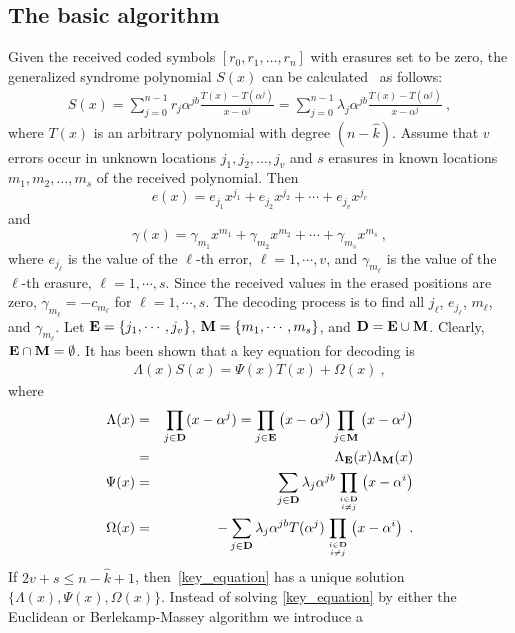 \documentclass[10pt,journal,letterpaper,compsoc]{IEEEtran}
\newcommand{\nn}{\nonumber}
\newcommand{\0}{{\bf 0}}
\begin{document}
\subsection{The basic algorithm}
Given the received coded symbols $[r_0, r_1, \ldots, r_n]$ with erasures
set to be zero, the generalized syndrome polynomial $S(x)$ can be
calculated~\cite{ARA92} as follows:
\begin{align}
S(x)=\displaystyle\sum_{j=0}^{n-1}r_j\alpha^{jb}\frac{T(x)-T(\alpha^j)}{x-\alpha^j}
=\displaystyle\sum_{j=0}^{n-1}\lambda_j\alpha^{jb}\frac{T(x)-T(\alpha^j)}{x-\alpha^j}~,
\label{syndrome}
\end{align}
where $T(x)$ is an arbitrary polynomial with degree $(n-\hat{k})$. Assume that $v$ errors occur in unknown locations
$j_1,j_2,\ldots,j_v$ and $s$ erasures in known locations $m_1,m_2,\ldots, m_s$ of the received polynomial. Then
$$e(x)=e_{j_1}x^{j_1}+e_{j_2}x^{j_2}+\cdots+e_{j_v}x^{j_v}$$
and
$$\gamma(x)=\gamma_{m_1}x^{m_1}+\gamma_{m_2}x^{m_2}+\cdots+\gamma_{m_s}x^{m_s}~,$$
where $e_{j_\ell}$ is the value of the $\ell$-th error, $\ell=1, \cdots, v$, and $\gamma_{m_\ell}$ is the value of the $\ell$-th erasure, $\ell=1, \cdots, s$. Since the received values in the erased positions are zero, $\gamma_{m_\ell}=-c_{m_\ell}$ for $\ell= 1, \cdots, s$. The decoding
process is to find all $j_\ell$, $e_{j_\ell}$, $m_\ell$, and $\gamma_{m_\ell}$. Let ${\bf E}=\{j_1,\cdots,j_v\}$, ${\bf M}=\{m_1,\cdots,m_s\}$, and ${\bf D}={\bf E}\cup {\bf M}$. Clearly, ${\bf E}\cap {\bf M}=\emptyset$.
It has been shown that a key equation for decoding is
\begin{eqnarray}
\Lambda(x)S(x)=\Psi(x)T(x)+\Omega(x)~,\label{key_equation}
\end{eqnarray}
where
\begin{eqnarray}
\Lambda(x)&=&\prod_{j\in {\bf D}}(x-\alpha^j)=\prod_{j\in {\bf E}}\left(x-\alpha^j\right)\prod_{j\in {\bf M}}\left(x-\alpha^j\right)\nn\\
&=&\Lambda_{\bf E}(x)\Lambda_{\bf M}(x)\label{sigma}\\
\Psi(x)&=&\sum_{j\in {\bf D}}\lambda_j\alpha^{jb}\prod_{{i\in {\bf D}}\atop{i\neq j}}\left(x-\alpha^i\right)\label{psi}\\
\Omega(x)&=&-\sum_{j\in {\bf D}}\lambda_j\alpha^{jb}T(\alpha^j)\prod_{{i\in {\bf D}}\atop{i\neq j}}\left(x-\alpha^i\right)~.\label{omega}
\end{eqnarray}
If $2v+s\le n-\hat{k}+1$, then~\eqref{key_equation} has a unique solution $\{\Lambda(x),\Psi(x),\Omega(x)\}$. Instead of solving \eqref{key_equation} by either the Euclidean or Berlekamp-Massey algorithm we introduce a
\end{document}
